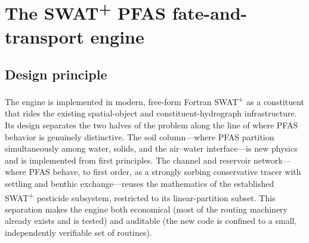 \section{The SWAT\textsuperscript{+} PFAS fate-and-transport engine}\label{sec:engine}

\subsection{Design principle}
The engine is implemented in modern, free-form Fortran SWAT\textsuperscript{+} as a constituent that rides the existing spatial-object and constituent-hydrograph infrastructure. Its design separates the two halves of the problem along the line of where PFAS behavior is genuinely distinctive. The soil column---where PFAS partition simultaneously among water, solids, and the air--water interface---is new physics and is implemented from first principles. The channel and reservoir network---where PFAS behave, to first order, as a strongly sorbing conservative tracer with settling and benthic exchange---reuses the mathematics of the established SWAT\textsuperscript{+} pesticide subsystem, restricted to its linear-partition subset. This separation makes the engine both economical (most of the routing machinery already exists and is tested) and auditable (the new code is confined to a small, independently verifiable set of routines).

